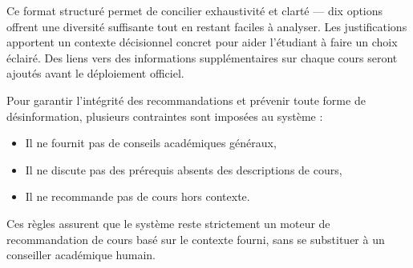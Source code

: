Ce format structuré permet de concilier exhaustivité et clarté --- dix options offrent une diversité suffisante tout en restant faciles à analyser. Les justifications apportent un contexte décisionnel concret pour aider l’étudiant à faire un choix éclairé. Des liens vers des informations supplémentaires sur chaque cours seront ajoutés avant le déploiement officiel.

Pour garantir l’intégrité des recommandations et prévenir toute forme de désinformation, plusieurs contraintes sont imposées au système :
\begin{itemize}
    \item Il ne fournit pas de conseils académiques généraux,
    \item Il ne discute pas des prérequis absents des descriptions de cours,
    \item Il ne recommande pas de cours hors contexte.
\end{itemize}

Ces règles assurent que le système reste strictement un moteur de recommandation de cours basé sur le contexte fourni, sans se substituer à un conseiller académique humain.
